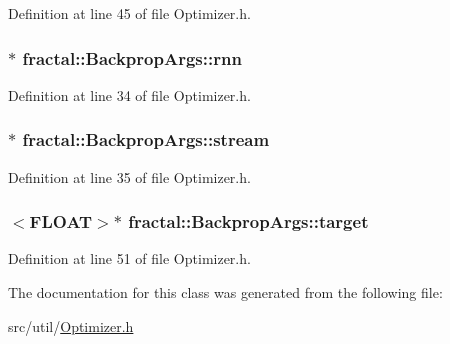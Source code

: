 Definition at line 45 of file Optimizer.\+h.

\hypertarget{classfractal_1_1BackpropArgs_a97feb3d265db3976066700f99b657e42}{
\subsubsection[{rnn}]{$\ast$ fractal\+::\+Backprop\+Args\+::rnn}}\label{classfractal_1_1BackpropArgs_a97feb3d265db3976066700f99b657e42}


Definition at line 34 of file Optimizer.\+h.

\hypertarget{classfractal_1_1BackpropArgs_a16eae72910a2734b8857e02dbd15f06e}{
\subsubsection[{stream}]{$\ast$ fractal\+::\+Backprop\+Args\+::stream}}\label{classfractal_1_1BackpropArgs_a16eae72910a2734b8857e02dbd15f06e}


Definition at line 35 of file Optimizer.\+h.

\hypertarget{classfractal_1_1BackpropArgs_a7940fb93db22188b97167905155fdc44}{
\subsubsection[{target}]{$<${\bf F\+L\+O\+A\+T}$>$$\ast$ fractal\+::\+Backprop\+Args\+::target}}\label{classfractal_1_1BackpropArgs_a7940fb93db22188b97167905155fdc44}


Definition at line 51 of file Optimizer.\+h.



The documentation for this class was generated from the following file\+:\begin{DoxyCompactItemize}
\item 
src/util/\hyperlink{Optimizer_8h}{Optimizer.\+h}\end{DoxyCompactItemize}
